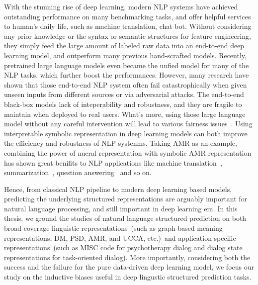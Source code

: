 With the stunning rise of deep learning, modern NLP systems have
achieved outstanding performance on many benchmarking tasks, and offer
helpful services to human's daily life, such as machine translation,
chat bot. Without considering any prior knowledge or the syntax or
semantic structures for feature engineering, they simply feed the
large amount of labeled raw data into an end-to-end deep learning
model, and outperform many previous hand-scrafted models. Recently,
pretrained large language models even became the unfied model for many
of the NLP tasks, which further boost the performances. However, many
research have shown that those end-to-end NLP system often fail
catastrophically when given unseen inputs from different sources or
via adversarial attacks. The end-to-end black-box models lack of
inteperability and robustness, and they are fragile to maintain when
deployed to real users. What's more, using those large language model
without any careful intervention will lead to various fairness
issues~\citep{bommasani2021opportunities}.  Using interpretable
symbolic representation in deep learning models can both improve the
efficiency and robustness of NLP systenms. Taking AMR as an example,
combining the power of nueral representation with symbolic AMR
representation has shown great benifits to NLP applications like
machine translation~\citep{song2019semantic},
summarization~\citep{liu2015toward}, question
answering~\citep{kapanipathi2021leveraging} and so on.

Hence, from classical NLP pipeline to modern deep learning based
models, predicting the underlying structured representations are
arguably important for natural language processing, and still
important in deep learning era. In this thesis, we ground the studies
of natural language structured prediction on both broad-coverage
linguistic representations~(such as graph-based meaning
representations, DM, PSD, AMR, and UCCA, etc.)~and
application-specific representations~(such as MISC code for
psychotherapy dialog and dialog state representations for
task-oriented dialog). More importantly, considering both the success
and the failure for the pure data-driven deep learning model, we focus
our study on the inductive biases useful in deep lingustic structured
prediction tasks.


%



